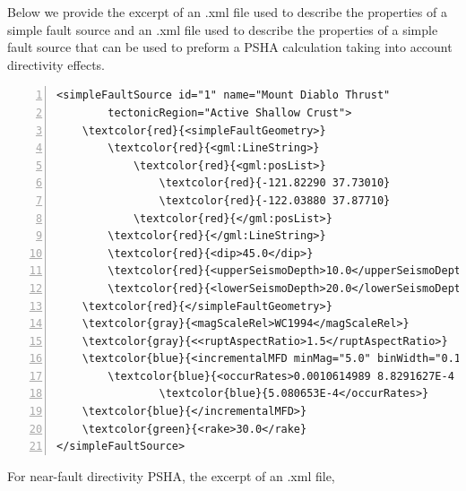 Below we provide the excerpt of an .xml file used to describe the 
properties of a simple fault source and an .xml file used to describe the
properties of a simple fault source that can be used to preform a PSHA
calculation taking into account directivity effects.
\begin{Verbatim}[frame=single, commandchars=\\\{\}, fontsize=\footnotesize,
    numbers=left, numbersep=2pt]
<simpleFaultSource id="1" name="Mount Diablo Thrust" 
		tectonicRegion="Active Shallow Crust">
    \textcolor{red}{<simpleFaultGeometry>}
        \textcolor{red}{<gml:LineString>}
            \textcolor{red}{<gml:posList>}
                \textcolor{red}{-121.82290 37.73010}
                \textcolor{red}{-122.03880 37.87710}
            \textcolor{red}{</gml:posList>}
        \textcolor{red}{</gml:LineString>}
        \textcolor{red}{<dip>45.0</dip>}
        \textcolor{red}{<upperSeismoDepth>10.0</upperSeismoDepth>}
        \textcolor{red}{<lowerSeismoDepth>20.0</lowerSeismoDepth>}
    \textcolor{red}{</simpleFaultGeometry>}
    \textcolor{gray}{<magScaleRel>WC1994</magScaleRel>}
    \textcolor{gray}{<<ruptAspectRatio>1.5</ruptAspectRatio>}
    \textcolor{blue}{<incrementalMFD minMag="5.0" binWidth="0.1">}
        \textcolor{blue}{<occurRates>0.0010614989 8.8291627E-4 7.3437777E-4 6.108288E-4 }
				\textcolor{blue}{5.080653E-4</occurRates>}
    \textcolor{blue}{</incrementalMFD>}
    \textcolor{green}{<rake>30.0</rake}
</simpleFaultSource>
\end{Verbatim}
\label{example_incremental_mfd}
For near-fault directivity PSHA, the excerpt of an .xml file,
